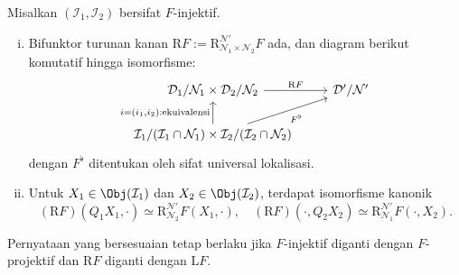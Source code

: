 \begin{proposisi}\label{prop:localization-injective-bifunctor}
	Misalkan $(\mathcal{I}_1,\mathcal{I}_2)$ bersifat $F$-injektif.
	\begin{enumerate}[(i)]
		\item Bifunktor turunan kanan
		$\mathrm{R}F:=\mathrm{R}^{\mathcal{N}'}_{\mathcal{N}_1\times\mathcal{N}_2}F$
		ada, dan diagram berikut komutatif hingga isomorfisme:
		\[\begin{tikzcd}
			\mathcal{D}_1 /\mathcal{N}_1 \times \mathcal{D}_2 /\mathcal{N}_2 \arrow[r, "\mathrm{R}F"] & \mathcal{D}'/\mathcal{N}' \\
			\mathcal{I}_1 /(\mathcal{I}_1 \cap \mathcal{N}_1) \times \mathcal{I}_2 /(\mathcal{I}_2 \cap \mathcal{N}_2) \arrow[u, "{i = (i_1, i_2): \text{ekuivalensi}}"] \arrow[ru, "{F^\flat}"'] &
		\end{tikzcd}\]
		dengan $F^\flat$ ditentukan oleh sifat universal lokalisasi.
		\item Untuk $X_1\in\Obj(\mathcal{I}_1)$ dan
		$X_2\in\Obj(\mathcal{I}_2)$, terdapat isomorfisme kanonik
		\[ (\mathrm{R}F)(Q_1 X_1, \cdot) \simeq \mathrm{R}^{\mathcal{N}'}_{\mathcal{N}_2} F(X_1, \cdot), \quad (\mathrm{R}F)(\cdot, Q_2 X_2) \simeq \mathrm{R}^{\mathcal{N}'}_{\mathcal{N}_1} F(\cdot, X_2). \]
	\end{enumerate}
	Pernyataan yang bersesuaian tetap berlaku jika $F$-injektif diganti dengan
	$F$-projektif dan $\mathrm{R}F$ diganti dengan $\mathrm{L}F$.
\end{proposisi}
